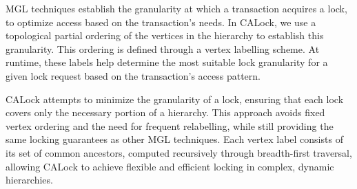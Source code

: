 MGL techniques establish the granularity at which a transaction acquires a lock, to optimize access based on the transaction's needs. In CALock, we use a topological partial ordering of the vertices in the hierarchy to establish this granularity. This ordering is defined through a vertex labelling scheme. At runtime, these labels help determine the most suitable lock granularity for a given lock request based on the transaction’s access pattern.

CALock attempts to minimize the granularity of a lock, ensuring that each lock covers only the necessary portion of a hierarchy. This approach avoids fixed vertex ordering and the need for frequent relabelling, while still providing the same locking guarantees as other MGL techniques. Each vertex label consists of its set of common ancestors, computed recursively through breadth-first traversal, allowing CALock to achieve flexible and efficient locking in complex, dynamic hierarchies.










